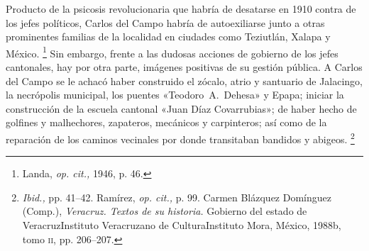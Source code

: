 \documentclass[14pt,twoside,final]{extbook} %
\let\oldfootnote\footnote
\renewcommand\footnote[1]{%
\oldfootnote{\hspace{1mm}#1}}
\begin{document}
Producto de la psicosis revolucionaria que habría de desatarse en 1910 contra de los jefes políticos, Carlos del Campo habría de autoexiliarse junto a otras prominentes familias de la localidad en ciudades como Teziutlán, Xalapa y México.\footnote{Landa, \emph{op. cit.,} 1946, p. 46.} Sin embargo, frente a las dudosas acciones de gobierno de los jefes cantonales, hay por otra parte, imágenes positivas de su gestión pública. A Carlos del Campo se le achacó haber construido el zócalo, atrio y santuario de Jalacingo, la necrópolis municipal, los puentes «\mbox{Teodoro A. Dehesa}» y Epapa; iniciar la construcción de la escuela cantonal «Juan Díaz Covarrubias»; de haber hecho de golfines y malhechores, zapateros, mecánicos y carpinteros; así como de la reparación de los caminos vecinales por donde transitaban bandidos y abigeos.\footnote{\emph{Ibid.,} pp. 41--42. Ramírez, \emph{op. cit.,} p. 99. Carmen Blázquez Domínguez (Comp.), \emph{Veracruz. Textos de su historia.} Gobierno del estado de Veracruz\kernedslash Instituto Veracruzano de Cultura\kernedslash Instituto Mora, México, 1988b, tomo \textsc{ii}, pp. 206--207.} \pagebreak[4]
\end{document}
